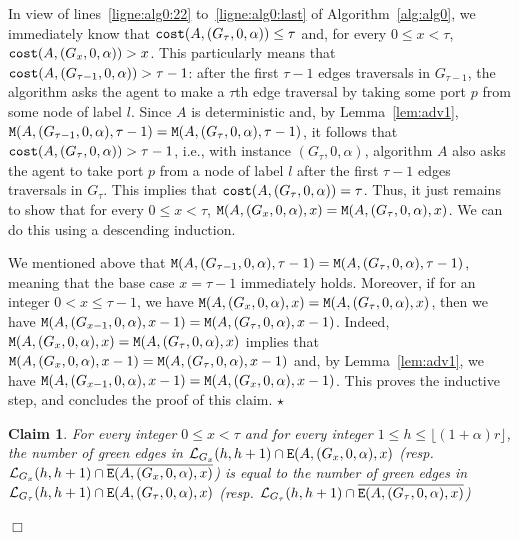 \documentclass[11pt]{article}
\newtheorem{claim}{Claim}[section]
\newcommand{\qed}{\hfill $\Box$ \bigbreak}
\newenvironment{proof}{\noindent {\bf Proof.}}{\qed}
\newenvironment{proofclaim}{\noindent{\bf Proof of the claim.}}{\hfill$\star$}
\begin{document}
{\begin{proof}
\begin{proofclaim}
In view of lines~\ref{ligne:alg0:22} to~\ref{ligne:alg0:last} of Algorithm~\ref{alg:alg0}, we immediately know that ${\tt cost}(A,(G_{\tau},0,\alpha))\leq \tau$ and, for every $0\leq x <\tau$, ${\tt cost}(A,(G_{x},0,\alpha))>x$. This particularly means that ${\tt cost}(A,(G_{\tau-1},0,\alpha))>\tau-1$: after the first $\tau-1$ edges traversals in $G_{\tau-1}$, the algorithm asks the agent to make a $\tau$th edge traversal by taking some port $p$ from some node of label $l$. Since $A$ is deterministic and, by Lemma~\ref{lem:adv1},  ${\tt M}(A,(G_{\tau-1},0,\alpha),\tau-1)={\tt M}(A,(G_{\tau},0,\alpha),\tau-1)$, it follows that ${\tt cost}(A,(G_{\tau},0,\alpha))> \tau-1$, i.e., with instance $(G_{\tau},0,\alpha)$, algorithm $A$ also asks the agent to take port $p$ from a node of label $l$ after the first $\tau-1$ edges traversals in $G_{\tau}$. This implies that ${\tt cost}(A,(G_{\tau},0,\alpha))= \tau$. Thus, it just remains to show that for every $0\leq x<\tau$, ${\tt M}(A,(G_{x},0,\alpha),x)={\tt M}(A,(G_{\tau},0,\alpha),x)$. We can do this using a descending induction.

We mentioned above that ${\tt M}(A,(G_{\tau-1},0,\alpha),\tau-1)={\tt M}(A,(G_{\tau},0,\alpha),\tau-1)$, meaning that the base case $x=\tau-1$ immediately holds. Moreover, if for an integer $0<x\leq\tau-1$, we have ${\tt M}(A,(G_{x},0,\alpha),x)={\tt M}(A,(G_{\tau},0,\alpha),x)$, then we have  ${\tt M}(A,(G_{x-1},0,\alpha),x-1)={\tt M}(A,(G_{\tau},0,\alpha),x-1)$. Indeed, ${\tt M}(A,(G_{x},0,\alpha),x)={\tt M}(A,(G_{\tau},0,\alpha),x)$ implies that ${\tt M}(A,(G_{x},0,\alpha),x-1)={\tt M}(A,(G_{\tau},0,\alpha),x-1)$ and, by Lemma~\ref{lem:adv1}, we have ${\tt M}(A,(G_{x-1},0,\alpha),x-1)={\tt M}(A,(G_{x},0,\alpha),x-1)$. This proves the inductive step, and concludes the proof of this claim.
\end{proofclaim}

\begin{claim}
\label{theo1:claim0bis}
For every integer $0\leq x<\tau$ and for every integer $1\leq h \leq  \lfloor(1+\alpha)r\rfloor$, the number of green edges in $\mathcal{L}_{G_{x}}(h,h+1)\cap{\tt E}(A,(G_{x},0,\alpha),x)$ (resp. $\mathcal{L}_{G_{x}}(h,h+1)\cap\overline{{\tt E}(A,(G_{x},0,\alpha),x)}$) is equal to the number of green edges in $\mathcal{L}_{G_{\tau}}(h,h+1)\cap{\tt E}(A,(G_{\tau},0,\alpha),x)$ (resp. $\mathcal{L}_{G_{\tau}}(h,h+1)\cap\overline{{\tt E}(A,(G_{\tau},0,\alpha),x)}$)
\end{claim}


\end{proof}}
\end{document}
